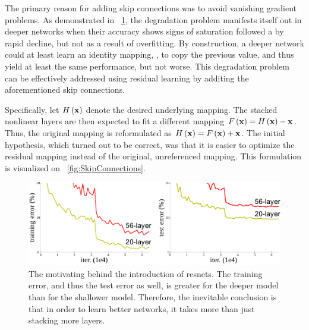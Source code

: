 The primary reason for adding skip connections was to avoid vanishing gradient problems. As demonstrated in \figtext{}~\ref{fig:ResnetMotivation}, the degradation problem manifests itself out in deeper networks when their accuracy shows signs of saturation followed a by rapid decline, but not as a result of overfitting. By construction, a deeper network could at least learn an identity mapping, \ietext{}, to copy the previous value, and thus yield at least the same performance, but not worse. This degradation problem can be effectively addressed using residual learning by additing the aforementioned skip connections.

Specifically, let ${H} \left( \mathbf{x} \right)$ denote the desired underlying mapping. The stacked nonlinear layers are then expected to fit a different mapping ${F} \left( \mathbf{x} \right) = {H} \left( \mathbf{x} \right) - \mathbf{x}$. Thus, the original mapping is reformulated as ${H} \left( \mathbf{x} \right) = {F} \left( \mathbf{x} \right) + \mathbf{x}$. The initial hypothesis, which turned out to be correct, was that it is easier to optimize the residual mapping instead of the original, unreferenced mapping. This formulation is visualized on \figtext{}~\ref{fig:SkipConnections}.

\begin{figure}[t]
    \centerline{\includegraphics[width=0.9\linewidth]{figures/theoretical_foundations/resnet_motivation.pdf}}
    \caption[\Gls{resnet} motivation]{The motivating behind the introduction of \glspl{resnet}. The training error, and thus the test error as well, is greater for the deeper model than for the shallower model. Therefore, the inevitable conclusion is that in order to learn better networks, it takes more than just stacking more layers. }
    \label{fig:ResnetMotivation}
\end{figure}

